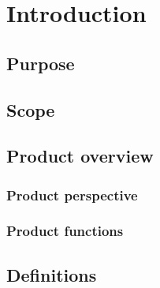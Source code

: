 \section{Introduction}

\subsection{Purpose}

\subsection{Scope}

\subsection{Product overview}

\subsubsection{Product perspective}

\subsubsection{Product functions}



\subsection{Definitions}